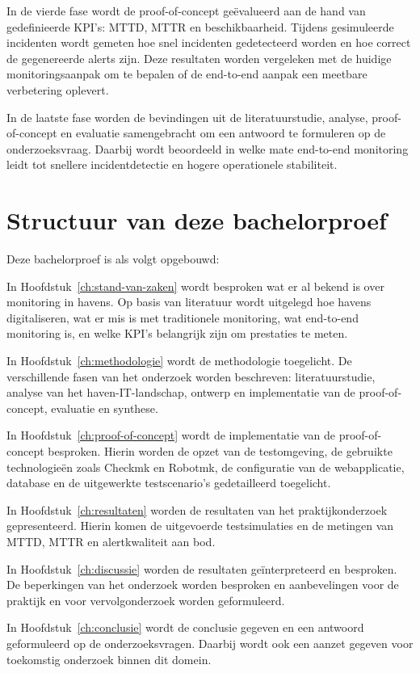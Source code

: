 In de vierde fase wordt de proof-of-concept geëvalueerd aan de hand van gedefinieerde KPI's: MTTD, MTTR en beschikbaarheid. Tijdens gesimuleerde incidenten wordt gemeten hoe snel incidenten gedetecteerd worden en hoe correct de gegenereerde alerts zijn. Deze resultaten worden vergeleken met de huidige monitoringsaanpak om te bepalen of de end-to-end aanpak een meetbare verbetering oplevert.

In de laatste fase worden de bevindingen uit de literatuurstudie, analyse, proof-of-concept en evaluatie samengebracht om een antwoord te formuleren op de onderzoeksvraag. Daarbij wordt beoordeeld in welke mate end-to-end monitoring leidt tot snellere incidentdetectie en hogere operationele stabiliteit.

\section{Structuur van deze bachelorproef}

Deze bachelorproef is als volgt opgebouwd:

In Hoofdstuk~\ref{ch:stand-van-zaken} wordt besproken wat er al bekend is over monitoring in havens. Op basis van literatuur wordt uitgelegd hoe havens digitaliseren, wat er mis is met traditionele monitoring, wat end-to-end monitoring is, en welke KPI's belangrijk zijn om prestaties te meten.

In Hoofdstuk~\ref{ch:methodologie} wordt de methodologie toegelicht. De verschillende fasen van het onderzoek worden beschreven: literatuurstudie, analyse van het haven-IT-landschap, ontwerp en implementatie van de proof-of-concept, evaluatie en synthese.

In Hoofdstuk~\ref{ch:proof-of-concept} wordt de implementatie van de proof-of-concept besproken. Hierin worden de opzet van de testomgeving, de gebruikte technologieën zoals Checkmk en Robotmk, de configuratie van de webapplicatie, database en de uitgewerkte testscenario’s gedetailleerd toegelicht.

In Hoofdstuk~\ref{ch:resultaten} worden de resultaten van het praktijkonderzoek gepresenteerd. Hierin komen de uitgevoerde testsimulaties en de metingen van MTTD, MTTR en alertkwaliteit aan bod.

In Hoofdstuk~\ref{ch:discussie} worden de resultaten geïnterpreteerd en besproken. De beperkingen van het onderzoek worden besproken en aanbevelingen voor de praktijk en voor vervolgonderzoek worden geformuleerd.

In Hoofdstuk~\ref{ch:conclusie} wordt de conclusie gegeven en een antwoord geformuleerd op de onderzoeksvragen. Daarbij wordt ook een aanzet gegeven voor toekomstig onderzoek binnen dit domein.
